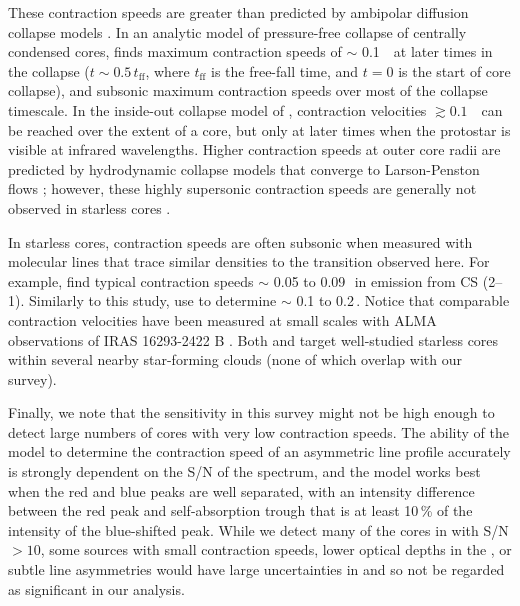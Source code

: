\documentclass[iop,twocolappendix]{emulateapj}
\begin{document}
These contraction speeds are greater than predicted by ambipolar diffusion collapse models \citep{ciolek95}. In an analytic model of pressure-free collapse of centrally condensed cores, \citet{myers05} finds maximum contraction speeds of $\sim$ 0.1\,\kms~ at later times in the collapse ($t \sim 0.5\,t_\mathrm{ff}$, where $t_\mathrm{ff}$ is the free-fall time, and $t=0$ is the start of core collapse), and subsonic maximum contraction speeds over most of the collapse timescale. In the inside-out collapse model of \citet{Shu1977}, contraction velocities $\gtrsim 0.1$~\kms\, can be reached over the extent of a core, but only at later times when the protostar is visible at infrared wavelengths. Higher contraction speeds at outer core radii are predicted by hydrodynamic collapse models that converge to Larson-Penston flows \citep[e.g.,][]{foster93}; however, these highly supersonic contraction speeds are generally not observed in starless cores \citep{Keto2015}. 

In starless cores, contraction speeds are often subsonic when measured with molecular lines that trace similar densities to the {\HCO} transition observed here. For example, \citet{lee01} find typical contraction speeds {\Vin} $\sim$ 0.05 to 0.09\,\kms\ in emission from CS (2--1). Similarly to this study, \citet{Schnee2013} use {\HCOrot} to determine {\Vin} $\sim$ 0.1 to 0.2\,\kms. Notice that comparable contraction velocities have been measured at small scales with ALMA observations of IRAS 16293-2422 B \citep{Pineda2012, Zapata2013}. Both \citeauthor{lee01} and \citeauthor{Schnee2013} target well-studied starless cores within several nearby star-forming clouds (none of which overlap with our survey).


Finally, we note that the sensitivity in this survey might not be high enough to detect large numbers of cores with very low contraction speeds. The ability of the {\Hill} model to determine the contraction speed of an asymmetric line profile accurately is strongly dependent on the S/N of the spectrum, and the model works best when the red and blue peaks are well separated, with an intensity difference between the red peak and self-absorption trough that is at least 10\,\% of the intensity of the blue-shifted peak. While we detect many of the cores in {\HCO} with S/N $> 10$, some sources with small contraction speeds, lower optical depths in the {\HCO}, or subtle line asymmetries would have large uncertainties in {\Vin} and so not be regarded as significant in our analysis. 
\end{document}
